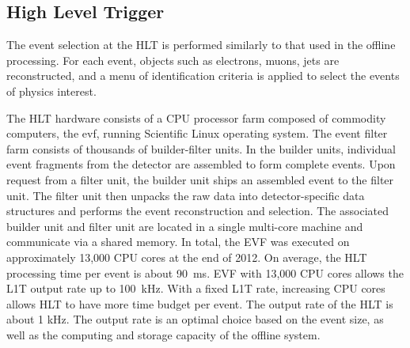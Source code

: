     






\subsection{High Level Trigger}

The event selection at the HLT is performed similarly to that used in the offline processing. For each event, objects such as electrons, muons, jets are reconstructed, and a menu of identification criteria is applied to select the events of physics interest.

The HLT hardware consists of a CPU processor farm composed of commodity computers, the \acrfull{evf}, running Scientific Linux operating system. The event filter farm consists of thousands of builder-filter units. In the builder units, individual event fragments from the detector are assembled to form complete events. Upon request from a filter unit, the builder unit ships an assembled event to the filter unit. The filter unit then unpacks the raw data into detector-specific data structures and performs the event reconstruction and selection. The associated builder unit and filter unit are located in a single multi-core machine and communicate via a shared memory. In total, the EVF was executed on approximately 13,000 CPU cores at the end of 2012. On average, the HLT processing time per event is about 90~ms. EVF with 13,000 CPU cores allows the L1T output rate up to 100~kHz. With a fixed L1T rate, increasing CPU cores allows HLT to have more time budget per event. The output rate of the HLT is about 1 kHz. The output rate is an optimal choice based on the event size, as well as the computing and storage capacity of the offline system.

